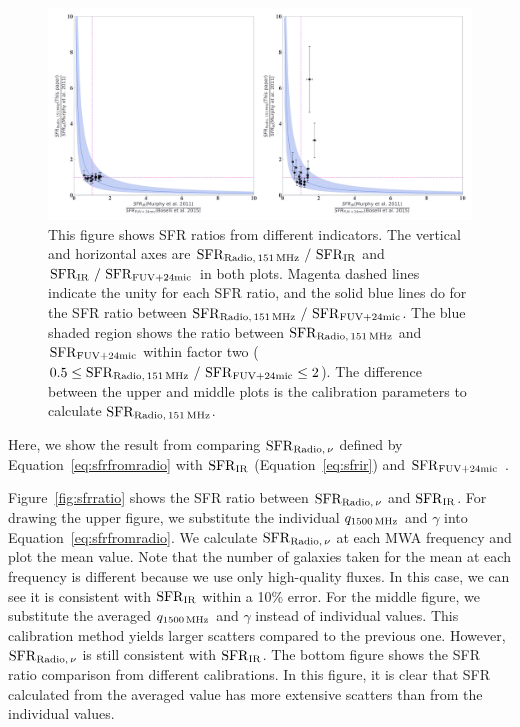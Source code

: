 \begin{figure}[htbp]
	\centering
	\includegraphics[width=\linewidth]{Chapter_5/Figures/Result_sfrratios.pdf}
    \caption[The consistency of the radio SFR with $\mr{SFR}\msb{IR}$ and $\mr{SFR}\msb{FUV+24mic}$]{\label{fig:sfrratios}
        This figure shows SFR ratios from different indicators.
        The vertical and horizontal axes are $\mr{SFR}\msb{Radio,\,151\MHz}\ /\ \mr{SFR}\msb{IR}$ and $\mr{SFR}\msb{IR}\ /\ \mr{SFR}\msb{FUV+24mic}$ in both plots.
        Magenta dashed lines indicate the unity for each SFR ratio, and the solid blue lines do for the SFR ratio between $\mr{SFR}\msb{Radio,\,151\MHz}\ /\ \mr{SFR}\msb{FUV+24mic}$.
        The blue shaded region shows the ratio between $\mathrm{SFR}_{\mathrm{Radio},\,151\,\mathrm{MHz}}$ and $\mr{SFR}\msb{FUV+24mic}$ within factor two ($0.5 \leq \mr{SFR}_{\mr{Radio},\,151\MHz}\ /\ \mr{SFR}\msb{FUV+24mic} \leq 2$).
        The difference between the upper and middle plots is the calibration parameters to calculate $\mathrm{SFR}_{\mathrm{Radio},\,151\,\mathrm{MHz}}$.
    }
\end{figure}

Here, we show the result from comparing $\mathrm{SFR}_{\mathrm{Radio},\,\nu}$ defined by Equation~\ref{eq:sfrfromradio} with $\mr{SFR}\msb{IR}$ (Equation~\ref{eq:sfrir}) and $\mr{SFR}\msb{FUV+24mic}$ \citep{Boselli2015}.

Figure~\ref{fig:sfrratio} shows the SFR ratio between $\mathrm{SFR}_{\mathrm{Radio},\,\nu}$ and $\mr{SFR}\msb{IR}$.
For drawing the upper figure, we substitute the individual $q_{1500\,\mathrm{MHz}}$ and $\gamma$ into Equation~\ref{eq:sfrfromradio}.
We calculate $\mathrm{SFR}_{\mathrm{Radio},\,\nu}$ at each MWA frequency and plot the mean value.
Note that the number of galaxies taken for the mean at each frequency is different because we use only high-quality fluxes.
In this case, we can see it is consistent with $\mr{SFR}\msb{IR}$ within a 10\% error.
For the middle figure, we substitute the averaged $q_{1500\,\mathrm{MHz}}$ and $\gamma$ instead of individual values.
This calibration method yields larger scatters compared to the previous one.
However, $\mathrm{SFR}_{\mathrm{Radio},\,\nu}$ is still consistent with $\mr{SFR}\msb{IR}$.
The bottom figure shows the SFR ratio comparison from different calibrations.
In this figure, it is clear that SFR calculated from the averaged value has more extensive scatters than from the individual values.

